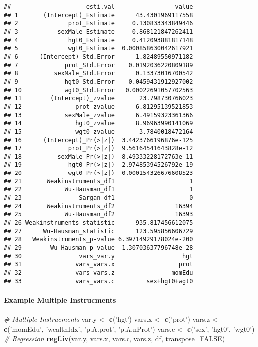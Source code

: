 \documentclass[
]{book}
\newenvironment{Shaded}{\begin{snugshade}}{\end{snugshade}}
\newcommand{\CommentTok}[1]{\textcolor[rgb]{0.56,0.35,0.01}{\textit{#1}}}
\newcommand{\DataTypeTok}[1]{\textcolor[rgb]{0.13,0.29,0.53}{#1}}
\newcommand{\KeywordTok}[1]{\textcolor[rgb]{0.13,0.29,0.53}{\textbf{#1}}}
\newcommand{\NormalTok}[1]{#1}
\newcommand{\OtherTok}[1]{\textcolor[rgb]{0.56,0.35,0.01}{#1}}
\newcommand{\StringTok}[1]{\textcolor[rgb]{0.31,0.60,0.02}{#1}}
\begin{document}
\begin{verbatim}
##                     esti.val                 value
## 1       (Intercept)_Estimate      43.4301969117558
## 2              prot_Estimate     0.130833343849446
## 3           sexMale_Estimate     0.868121847262411
## 4              hgt0_Estimate     0.412093881817148
## 5              wgt0_Estimate  0.000858630042617921
## 6      (Intercept)_Std.Error      1.82489550971182
## 7             prot_Std.Error    0.0192036220809189
## 8          sexMale_Std.Error      0.13373016700542
## 9             hgt0_Std.Error    0.0459431912927002
## 10            wgt0_Std.Error   0.00022691057702563
## 11        (Intercept)_zvalue       23.798730766023
## 12               prot_zvalue      6.81295139521853
## 13            sexMale_zvalue      6.49159323361366
## 14               hgt0_zvalue      8.96963990141069
## 15               wgt0_zvalue       3.7840018472164
## 16      (Intercept)_Pr(>|z|)  3.4423766196876e-125
## 17             prot_Pr(>|z|)  9.56164541643828e-12
## 18          sexMale_Pr(>|z|)  8.49333228172763e-11
## 19             hgt0_Pr(>|z|)  2.97485394526792e-19
## 20             wgt0_Pr(>|z|)  0.000154326676608523
## 21       Weakinstruments_df1                     1
## 22            Wu-Hausman_df1                     1
## 23                Sargan_df1                     0
## 24       Weakinstruments_df2                 16394
## 25            Wu-Hausman_df2                 16393
## 26 Weakinstruments_statistic      935.817456612075
## 27      Wu-Hausman_statistic      123.595856606729
## 28   Weakinstruments_p-value 6.39714929178024e-200
## 29        Wu-Hausman_p-value  1.30703637796748e-28
## 30                vars_var.y                   hgt
## 31               vars_vars.x                  prot
## 32               vars_vars.z                momEdu
## 33               vars_vars.c         sex+hgt0+wgt0
\end{verbatim}

\hypertarget{example-multiple-instrucments}{%
\paragraph{Example Multiple Instrucments}\label{example-multiple-instrucments}}

\begin{Shaded}
\begin{Highlighting}[]
\CommentTok{# Multiple Instrucments}
\NormalTok{var.y <-}\StringTok{ }\KeywordTok{c}\NormalTok{(}\StringTok{'hgt'}\NormalTok{)}
\NormalTok{vars.x <-}\StringTok{ }\KeywordTok{c}\NormalTok{(}\StringTok{'prot'}\NormalTok{)}
\NormalTok{vars.z <-}\StringTok{ }\KeywordTok{c}\NormalTok{(}\StringTok{'momEdu'}\NormalTok{, }\StringTok{'wealthIdx'}\NormalTok{, }\StringTok{'p.A.prot'}\NormalTok{, }\StringTok{'p.A.nProt'}\NormalTok{)}
\NormalTok{vars.c <-}\StringTok{ }\KeywordTok{c}\NormalTok{(}\StringTok{'sex'}\NormalTok{, }\StringTok{'hgt0'}\NormalTok{, }\StringTok{'wgt0'}\NormalTok{)}
\CommentTok{# Regression}
\KeywordTok{regf.iv}\NormalTok{(var.y, vars.x, vars.c, vars.z, df, }\DataTypeTok{transpose=}\OtherTok{FALSE}\NormalTok{)}
\end{Highlighting}
\end{Shaded}
\end{document}
